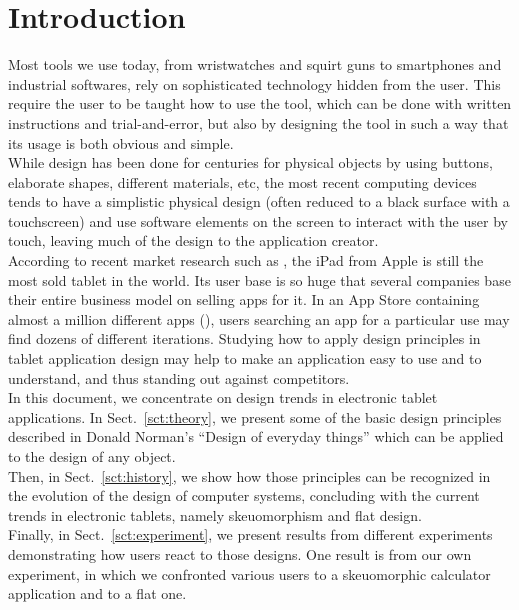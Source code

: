 \documentclass[a4paper,11pt] {article}
\theoremstyle{definition}
\begin{document}
\pagebreak

\tableofcontents
\pagebreak

\section{Introduction}

Most tools we use today, from wristwatches and squirt guns to smartphones and industrial softwares, rely on sophisticated technology hidden from the user. This require the user to be taught how to use the tool, which can be done with written instructions and trial-and-error, but also by designing the tool in such a way that its usage is both obvious and simple.\\

While design has been done for centuries for physical objects by using buttons, elaborate shapes, different materials, etc, the most recent computing devices tends to have a simplistic physical design (often reduced to a black surface with a touchscreen) and use software elements on the screen to interact with the user by touch, leaving much of the design to the application creator.\\

According to recent market research such as \cite{ABI-android}, the iPad from Apple is still the most sold tablet in the world. Its user base is so huge that several companies base their entire business model on selling apps for it. In an App Store containing almost a million different apps (\cite{iOs61}), users searching an app for a particular use may find dozens of different iterations. Studying how to apply design principles in tablet application design may help to make an application easy to use and to understand, and thus standing out against competitors.\\

In this document, we concentrate on design trends in electronic tablet applications. In Sect.~\ref{sct:theory}, we present some of the basic design principles described in Donald Norman's ``Design of everyday things'' \cite{Norman02} which can be applied to the design of any object.\\

Then, in Sect.~\ref{sct:history}, we show how those principles can be recognized in the evolution of the design of computer systems, concluding with the current trends in electronic tablets, namely skeuomorphism and flat design.\\

Finally, in Sect.~\ref{sct:experiment}, we present results from different experiments demonstrating how users react to those designs. One result is from our own experiment, in which we confronted various users to a skeuomorphic calculator application and to a flat one.\\
\end{document}
